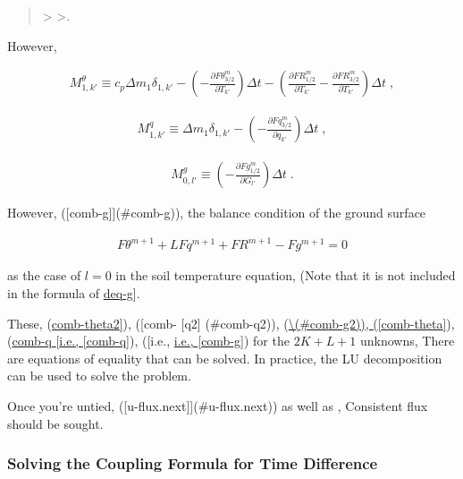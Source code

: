 \begin{quote}
\blaze\textgreater{} \blade\textgreater.
\end{quote}

However,

\begin{eqnarray}
M^{\theta}_{1,k'} \equiv c_p \Delta m_1 \delta_{1,k'}
          -  \left(
                   - \frac{\partial F\theta^{m}_{3/2}}{\partial T_{k'}} \right) \Delta t
          -  \left( \frac{\partial FR^{m}_{1/2}}{\partial T_{k'}}
                   - \frac{\partial FR^{m}_{3/2}}{\partial T_{k'}} \right) \Delta t \; ,
\end{eqnarray}

\begin{eqnarray}
M^{q}_{1,k'} \equiv \Delta m_1 \delta_{1,k'}
          -  \left(
                   - \frac{\partial Fq^{m}_{3/2}}{\partial q_{k'}} \right) \Delta t \; ,
\end{eqnarray}

\begin{eqnarray}
M^{g}_{0,l'} \equiv
             \left(
                   - \frac{\partial Fg^{m}_{1/2}}{\partial G_{l'}} \right) \Delta t \; .
\end{eqnarray}

However, ({[}comb-g{]}{]}(\#comb-g)), the balance condition of the
ground surface

\begin{eqnarray}
   F\theta^{m+1} + L Fq^{m+1} + FR^{m+1} - Fg^{m+1} = 0
\end{eqnarray}

as the case of \(l=0\) in the soil temperature equation, (Note that it
is not included in the formula of \protect\hyperlink{deq-g}{deq-g}{]}.

These, (\protect\hyperlink{comb-theta2}{comb-theta2{]}}), ({[}comb-
{[}q2{]} (\#comb-q2)),
(\protect\hyperlink{comb-theta}{\textbackslash{}\centric[comb-g2\end{eqnarray}] (\#comb-g2)),
({[}comb-theta{]}}), (\protect\hyperlink{comb-q}{comb-q {[}i.e.,
{[}comb-q{]}}), ({[}i.e., \protect\hyperlink{comb-g}{i.e.,
{[}comb-g{]}}) for the \(2K+L+1\) unknowns, There are equations of
equality that can be solved. In practice, the LU decomposition can be
used to solve the problem.

Once you're untied, ({[}u-flux.next{]}{]}(\#u-flux.next)) as well as ,
Consistent flux should be sought.

\hypertarget{solving-the-coupling-formula-for-time-difference}{%
\subsubsection{Solving the Coupling Formula for Time
Difference}\label{solving-the-coupling-formula-for-time-difference}}

